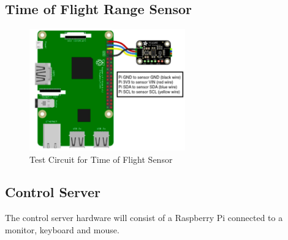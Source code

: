 \subsection{Time of Flight Range Sensor}

\begin{figure}[!htb]
\centering
\includegraphics[width=0.6\textwidth]{images/tof-test-circuit.png}
\caption{Test Circuit for Time of Flight Sensor}
\label{fig:tof-test-circuit}
\end{figure}


\subsection{Control Server}

The control server hardware will consist of a Raspberry Pi connected to a
monitor, keyboard and mouse.

